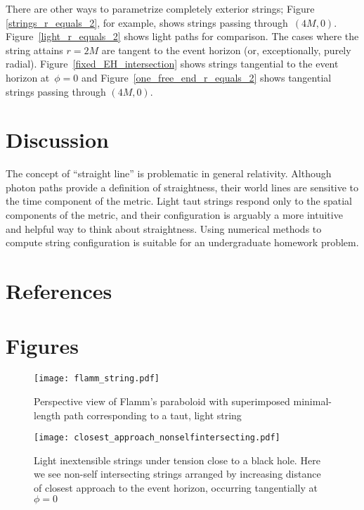 \documentclass[review]{elsarticle}
\begin{document}
There are other ways to parametrize completely exterior strings;
Figure \ref{strings_r_equals_2}, for example, shows strings passing
through~$(4M,0)$.  Figure~\ref{light_r_equals_2} shows light paths for
comparison.  The cases where the string attains $r=2M$ are tangent to
the event horizon (or, exceptionally, purely radial).
Figure~\ref{fixed_EH_intersection} shows strings tangential to the
event horizon at~$\phi=0$ and Figure~\ref{one_free_end_r_equals_2}
shows tangential strings passing through $(4M,0)$.

\section{Discussion}

The concept of ``straight line'' is problematic in general relativity.
Although photon paths provide a definition of straightness, their
world lines are sensitive to the time component of the metric.  Light
taut strings respond only to the spatial components of the metric, and
their configuration is arguably a more intuitive and helpful way to
think about straightness.  Using numerical methods to compute string
configuration is suitable for an undergraduate homework problem.

\section*{References}


\clearpage

\section*{Figures}

\begin{figure}[h!] %
\centering
\texttt{[image: flamm\_string.pdf]}
\caption{Perspective view of Flamm's paraboloid with superimposed minimal-length
  path corresponding to a taut, light string}
\label{flamm}
\end{figure}

\begin{figure}[p] %
\centering
\texttt{[image: closest\_approach\_nonselfintersecting.pdf]}
\caption{Light inextensible strings under tension close to a black
  hole.  Here we see non-self intersecting strings arranged by
  increasing distance of closest approach to the event horizon,
  occurring tangentially at~$\phi=0$}
\label{closest_approach_non_self_intersecting}
\end{figure}
\end{document}
